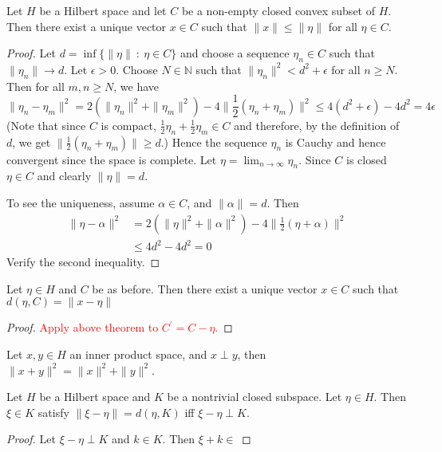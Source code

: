 
\begin{theorem}
  Let $H$ be a Hilbert space and let $C$ be a non-empty closed convex
  subset of $H$. Then there exist a unique vector $x \in C$ such that
  $\|x\| \le \|\eta\|$ for all $\eta \in C$.
\end{theorem}
\begin{proof}
  Let $d = \inf \{ \|\eta\|  \ : \ \eta \in C  \}$ and choose a
  sequence $ \eta_n \in C$  such that $\|\eta_n\| \to d$. Let $
  \epsilon > 0$. Choose $N \in \mathbb{N}$ such that $\|\eta_n\|^2 <
  d^2 + \epsilon$ for all $n \ge N$. Then for all $m,n \ge N$, we have \[
    \|\eta_n - \eta_m\|^2 = 2(\|\eta_n\|^2 + \|\eta_m\|^2) - 4 \|
    \frac{1}{2}(\eta_n + \eta_m) \|^2 \le 4(d^2  + \epsilon) - 4d^2 = 4 \epsilon
  \]
  (Note that since $C$ is compact, $\frac{1}{2}\eta_n +
    \frac{1}{2}\eta_m \in C$ and therefore, by the definition of $d$,
  we get $\|\frac{1}{2}(\eta_n + \eta_m)\| \ge d$.) Hence the sequence
  $\eta_n$ is Cauchy and hence convergent since
  the space is complete. Let $\eta = \lim_{n \to \infty} \eta_n$.
  Since $C$ is closed $\eta \in C$ and clearly $\|\eta\| = d$.

  To see the uniqueness, assume $\alpha \in C$, and $\| \alpha\| = d$. Then
  \begin{align*}
    \|\eta - \alpha\|^2 &= 2(\|\eta\|^2 + \|\alpha\|^2) - 4 \|
    \frac{1}{2}(\eta + \alpha) \|^2 \\
    & \le 4d^2 - 4d^2 = 0
  \end{align*}
  Verify the second inequality.
\end{proof}

\begin{corollary}
  Let $\eta \in H$ and $C$ be as before. Then there exist a unique
  vector $x \in C$ such that $d(\eta, C) = \|x - \eta\|$
\end{corollary}
\begin{proof}
  \textcolor{red}{Apply above theorem to $C^\prime = C - \eta$.}
\end{proof}

\begin{proposition}
  Let $ x, y \in H$ an inner product space, and $x \perp y$, then
  $\|x + y\|^2 = \|x\|^2 + \|y\|^2$.
\end{proposition}

\begin{lemma}
  \label{lem:15}
  Let $H$ be a Hilbert space and $K$ be a nontrivial closed subspace.
  Let $\eta \in H$. Then $\xi \in K$ satisfy $\|\xi - \eta\| = d(\eta, K)$ iff
  $\xi - \eta \perp K$.
\end{lemma}
\begin{proof}
  Let $\xi - \eta \perp K$ and $k \in K$. Then $\xi + k \in $
\end{proof}

